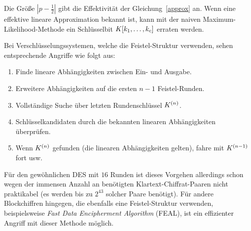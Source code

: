 Die Größe $\left|{p-\frac{1}{2}}\right|$ gibt die Effektivität der
Gleichung~\ref{approx} an. Wenn eine effektive lineare Approximation
bekannt ist, kann mit der naiven Maximum-Likelihood-Methode ein
Schlüsselbit $K[k_1,\dots, k_c]$ erraten werden. 

Bei Verschlüsselungssystemen, welche die Feistel-Struktur \indexFeistel
verwenden, sehen entsprechende Angriffe wie folgt aus: 
\begin{enumerate}
\item Finde lineare Abhängigkeiten zwischen Ein- und Ausgabe.
\item Erweitere Abhängigkeiten auf die ersten $n-1$ Feistel-Runden.
\item Vollständige Suche über letzten Rundenschlüssel $K^{(n)}$.
\item Schlüsselkandidaten durch die bekannten linearen Abhängigkeiten überprüfen.
\item Wenn $K^{(n)}$ gefunden (\dh die linearen Abhängigkeiten
  gelten), fahre mit $K^{(n-1)}$ fort usw. 
\end{enumerate}

Für den gewöhnlichen DES mit $16$ Runden ist dieses Vorgehen allerdings
schon wegen der immensen Anzahl an benötigten Klartext-Chiffrat-Paaren
nicht praktikabel (es werden bis zu $2^{43}$ solcher Paare
benötigt). Für andere Blockchiffren hingegen, die ebenfalls eine
Feistel-Struktur verwenden, beispielsweise \emph{Fast Data Encipherment
  Algorithm} (FEAL), ist ein effizienter Angriff mit dieser Methode
möglich. 

